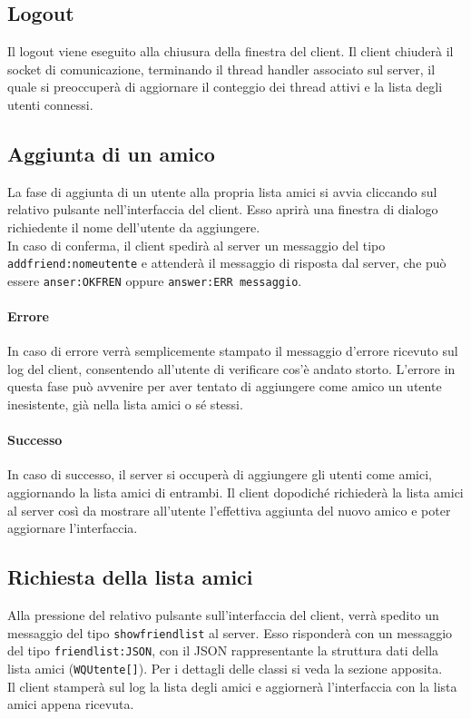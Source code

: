 \documentclass[10pt]{article}
\begin{document}
{\subsection{Logout}
Il logout viene eseguito alla chiusura della finestra del client. Il client chiuderà il socket di comunicazione, terminando il thread handler associato sul server, il quale si preoccuperà di aggiornare il conteggio dei thread attivi e la lista degli utenti connessi.

\subsection{Aggiunta di un amico}
La fase di aggiunta di un utente alla propria lista amici si avvia cliccando sul relativo pulsante nell'interfaccia del client. Esso aprirà una finestra di dialogo richiedente il nome dell'utente da aggiungere.\\
In caso di conferma, il client spedirà al server un messaggio del tipo \texttt{addfriend:nomeutente} e attenderà il messaggio di risposta dal server, che può essere \texttt{anser:OKFREN} oppure \texttt{answer:ERR messaggio}.
\paragraph{Errore} In caso di errore verrà semplicemente stampato il messaggio d'errore ricevuto sul log del client, consentendo all'utente di verificare cos'è andato storto. L'errore in questa fase può avvenire per aver tentato di aggiungere come amico un utente inesistente, già nella lista amici o sé stessi.
\paragraph{Successo} In caso di successo, il server si occuperà di aggiungere gli utenti come amici, aggiornando la lista amici di entrambi. Il client dopodiché richiederà la lista amici al server così da mostrare all'utente l'effettiva aggiunta del nuovo amico e poter aggiornare l'interfaccia.

\subsection{Richiesta della lista amici}
Alla pressione del relativo pulsante sull'interfaccia del client, verrà spedito un messaggio del tipo \texttt{showfriendlist} al server. Esso risponderà con un messaggio del tipo \texttt{friendlist:JSON}, con il JSON rappresentante la struttura dati della lista amici (\texttt{WQUtente[]}). Per i dettagli delle classi si veda la sezione apposita.\\
Il client stamperà sul log la lista degli amici e aggiornerà l'interfaccia con la lista amici appena ricevuta.

}
\end{document}
